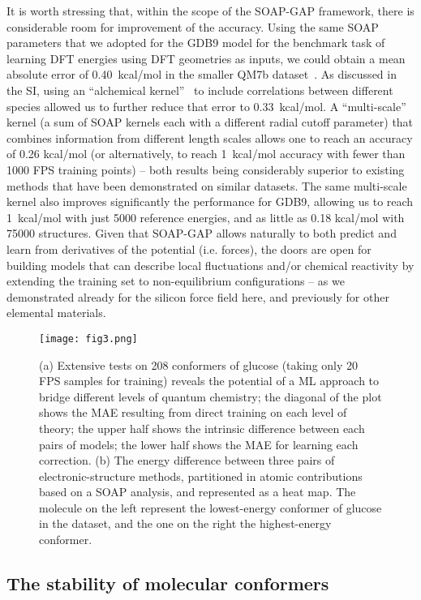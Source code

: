 \documentclass[12pt]{article}
\newcommand{\twocol}{12cm}
\begin{document}
{It is worth stressing that, 
within the scope of the SOAP-GAP framework, there is considerable room for improvement of the accuracy. Using the same SOAP parameters that we adopted for the GDB9 model for the benchmark task of learning DFT energies using DFT geometries as inputs, we could obtain a mean absolute error of 0.40~kcal/mol in the smaller QM7b dataset~\cite{mont+13njp}.
As discussed in the SI, using an ``alchemical kernel''~\cite{de+16pccp} to include correlations between different species allowed us to further reduce that error to 0.33~kcal/mol. A ``multi-scale'' kernel (a sum of SOAP kernels each with a different radial cutoff parameter) that combines information from different length scales allows one to reach an accuracy of 0.26 kcal/mol (or alternatively, to reach 1~kcal/mol accuracy with fewer than 1000 FPS training points) -- both results being considerably superior to existing methods that have been demonstrated on similar datasets.
{The same multi-scale kernel also improves significantly the performance for GDB9, allowing us to reach 1~kcal/mol with just 5000 reference energies, and as little as 0.18 kcal/mol with 75000 structures.}
Given that SOAP-GAP allows naturally to both predict and learn from derivatives of the potential (i.e. forces), the doors are open for building models that can describe local fluctuations and/or chemical reactivity by extending the training set to non-equilibrium configurations -- as we demonstrated already for the silicon force field here, and previously for other elemental materials. 
}

\begin{figure}[bt]
\centering\texttt{[image: fig3.png]}
\caption{ (a) Extensive tests on 208 
conformers of glucose (taking only 20 FPS samples for
training) reveals the potential of a ML approach 
to bridge different levels of quantum chemistry; the 
diagonal of the plot shows the MAE resulting
from direct training on each level of theory;
the upper half shows the intrinsic difference between 
each pairs of models; the lower half
shows the MAE for learning each correction. 
{(b) The energy difference between three pairs of  electronic-structure methods, partitioned in atomic contributions based on a SOAP analysis, and represented as a heat map. The molecule on the left represent the lowest-energy conformer of glucose in the dataset, and the one on the right the highest-energy conformer.}
}
\label{fig:others}
\end{figure}


\subsection{The stability of molecular conformers}
\end{document}
